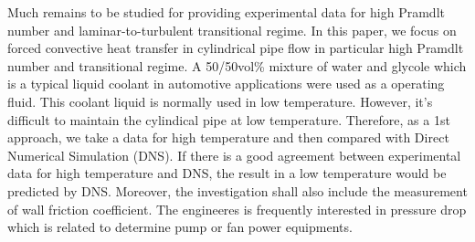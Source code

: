 \documentclass[conference]{IEEEtran}
\begin{document}
Much remains to be studied for providing experimental data for high Pramdlt number and laminar-to-turbulent transitional regime.
In this paper, we focus on forced convective heat transfer in cylindrical pipe flow in particular high Pramdlt number and transitional regime.
A 50/50vol\% mixture of water and glycole which is a typical liquid coolant in automotive applications were used as a operating fluid.
This coolant liquid is normally used in low temperature.
However, it's difficult to maintain the cylindical pipe at low temperature.
Therefore, as a 1st approach, we take a data for high temperature and then compared with Direct Numerical Simulation (DNS).
If there is a good agreement between experimental data for high temperature and DNS, the result in a low temperature would be predicted by DNS.
Moreover, the investigation shall also include the measurement of wall friction coefficient.
The engineeres is frequently interested in pressure drop which is related to determine pump or fan power equipments.

%
\end{document}
